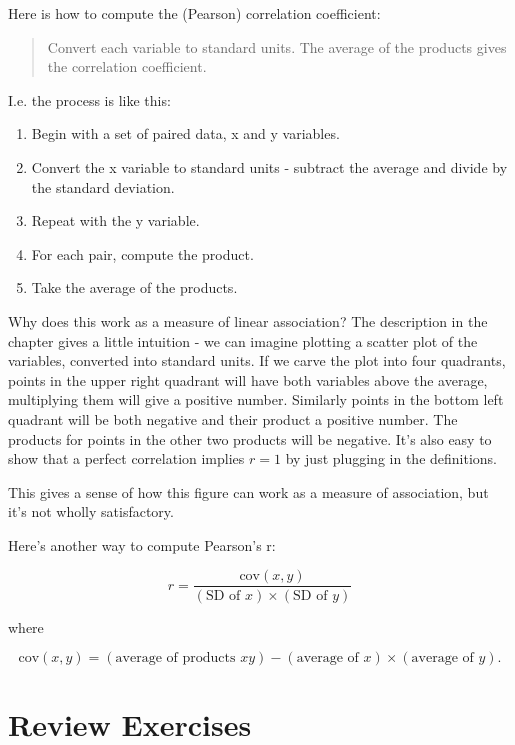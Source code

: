 \documentclass[
]{book}
\providecommand{\tightlist}{%
  \setlength{\itemsep}{0pt}\setlength{\parskip}{0pt}}
\begin{document}
Here is how to compute the (Pearson) correlation coefficient:

\begin{quote}
Convert each variable to standard units. The average of the products gives the correlation coefficient.
\end{quote}

I.e. the process is like this:

\begin{enumerate}
\def\labelenumi{\arabic{enumi}.}
\tightlist
\item
  Begin with a set of paired data, x and y variables.
\item
  Convert the x variable to standard units - subtract the average and divide by the standard deviation.
\item
  Repeat with the y variable.
\item
  For each pair, compute the product.
\item
  Take the average of the products.
\end{enumerate}

Why does this work as a measure of linear association? The description in the chapter gives a little intuition - we can imagine plotting a scatter plot of the variables, converted into standard units. If we carve the plot into four quadrants, points in the upper right quadrant will have both variables above the average, multiplying them will give a positive number. Similarly points in the bottom left quadrant will be both negative and their product a positive number. The products for points in the other two products will be negative. It's also easy to show that a perfect correlation implies \(r=1\) by just plugging in the definitions.

This gives a sense of how this figure can work as a measure of association, but it's not wholly satisfactory.

Here's another way to compute Pearson's r:

\[
 r = \frac{\text{cov}(x,y)}{(\text{SD of }x) \times (\text{SD of }y)}
\]

where

\[
\text{cov}(x,y) = (\text{average of products }xy) - (\text{average of }x) \times (\text{average of }y).
\]

\hypertarget{review-exercises-6}{%
\section{Review Exercises}\label{review-exercises-6}}
\end{document}

